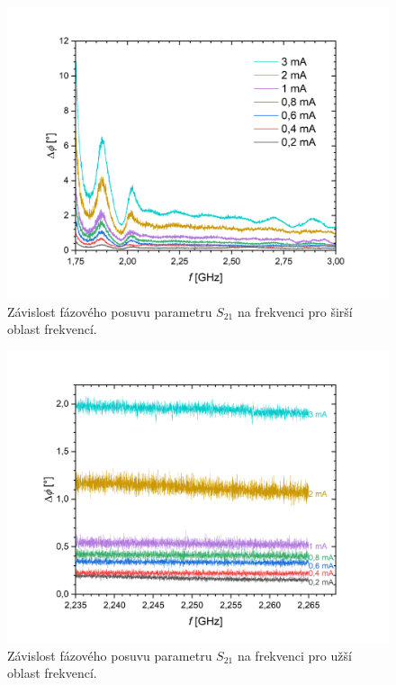 \documentclass[a4paper,12pt]{article}
\begin{document}
\begin{figure}[h]
	\centering
	\includegraphics[width=0.9\linewidth]{phasetofreq.png}
	\caption{Závislost fázového posuvu parametru $S_{21}$ na frekvenci pro 
	širší oblast frekvencí.}
	\label{phasetofreq}
\end{figure}

\begin{figure}[h]
	\centering
	\includegraphics[width=0.9\linewidth]{phasetofreqzoom.png}
	\caption{Závislost fázového posuvu parametru $S_{21}$ na frekvenci pro 
		užší oblast frekvencí.}
	\label{phasetofreqzoom}
\end{figure}
\end{document}
